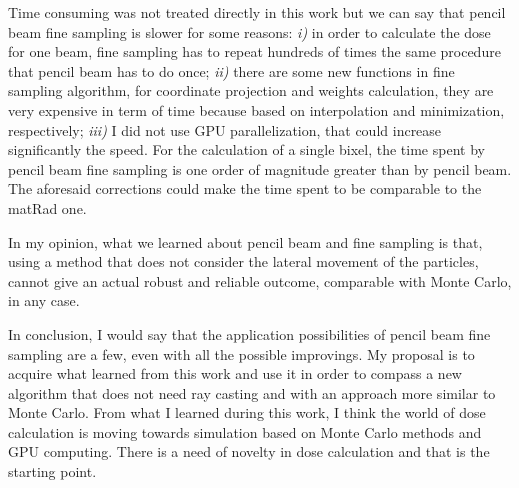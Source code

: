 \documentclass[12pt, a4paper, twoside]{book}
\begin{document}
Time consuming was not treated directly in this work but we can say that pencil beam fine sampling is slower for some reasons: \emph{i)} in order to calculate the dose for one beam, fine sampling has to repeat hundreds of times the same procedure that pencil beam has to do once; \emph{ii)} there are some new functions in fine sampling algorithm, for coordinate projection and weights calculation, they are very expensive in term of time because based on interpolation and minimization, respectively; \emph{iii)} I did not use GPU parallelization, that could increase significantly the speed.
For the calculation of a single bixel, the time spent by pencil beam fine sampling is one order of magnitude greater than by pencil beam.
The aforesaid corrections could make the time spent to be comparable to the matRad one.

In my opinion, what we learned about pencil beam and fine sampling is that, using a method that does not consider the lateral movement of the particles, cannot give an actual robust and reliable outcome, comparable with Monte Carlo, in any case.

In conclusion, I would say that the application possibilities of pencil beam fine sampling are a few, even with all the possible improvings. My proposal is to acquire what learned from this work and use it in order to compass a new algorithm that does not need ray casting and with an approach more similar to Monte Carlo. From what I learned during this work, I think the world of dose calculation is moving towards simulation based on Monte Carlo methods and GPU computing. There is a need of novelty in dose calculation and that is the starting point.



\listoffigures
\listoftables
\end{document}
